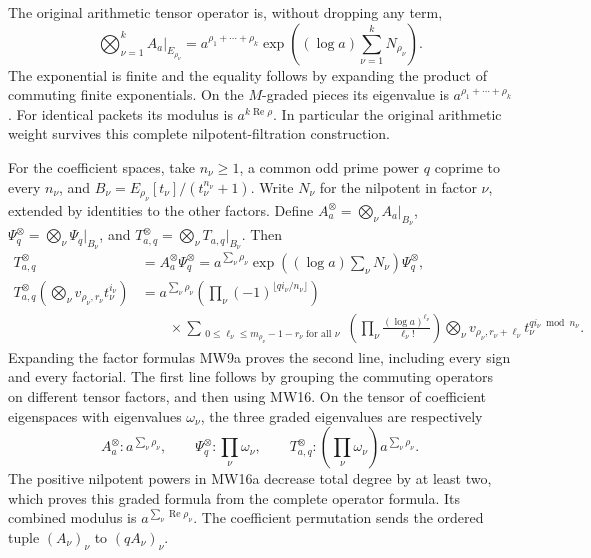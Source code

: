 The original arithmetic tensor operator is, without dropping any term,
\[
 \bigotimes_{\nu=1}^k A_a|_{E_{\rho_\nu}}
  =a^{\rho_1+\cdots+\rho_k}
     \exp\!\left((\log a)\sum_{\nu=1}^k N_{\rho_\nu}\right).
 \tag{MW16}
\]
The exponential is finite and the equality follows by expanding
the product of commuting finite exponentials. On the \(M\)-graded
pieces its eigenvalue is \(a^{\rho_1+\cdots+\rho_k}\).
For identical packets its modulus is \(a^{k\operatorname{Re}\rho}\).
In particular the original arithmetic weight survives this complete
nilpotent-filtration construction.

For the coefficient spaces, take \(n_\nu\geq1\), a common odd prime
power \(q\) coprime to every \(n_\nu\), and
\(B_\nu=E_{\rho_\nu}[t_\nu]/(t_\nu^{n_\nu}+1)\).
Write \(N_\nu\) for the nilpotent in factor \(\nu\), extended by
identities to the other factors. Define
\(A_a^{\otimes}=\bigotimes_\nu A_a|_{B_\nu}\),
\(\Psi_q^{\otimes}=\bigotimes_\nu\Psi_q|_{B_\nu}\), and
\(T_{a,q}^{\otimes}=\bigotimes_\nu T_{a,q}|_{B_\nu}\). Then
\[
 \begin{aligned}
 T_{a,q}^{\otimes}
 &=A_a^{\otimes}\Psi_q^{\otimes}
  =a^{\sum_\nu\rho_\nu}
       \exp\!\left((\log a)\sum_\nu N_\nu\right)
          \Psi_q^{\otimes},\\
 T_{a,q}^{\otimes}\left(\bigotimes_\nu
                         v_{\rho_\nu,r_\nu}t_\nu^{i_\nu}\right)
 &=a^{\sum_\nu\rho_\nu}
   \left(\prod_\nu(-1)^{\lfloor qi_\nu/n_\nu\rfloor}\right)\\
 &\qquad{}\times
   \sum_{\substack{0\leq\ell_\nu\leq
                         m_{\rho_\nu}-1-r_\nu\;\text{for all }\nu}}
   \left(\prod_\nu\frac{(\log a)^{\ell_\nu}}{\ell_\nu!}\right)
   \bigotimes_\nu
    v_{\rho_\nu,r_\nu+\ell_\nu}
                      t_\nu^{qi_\nu\bmod n_\nu}.
 \end{aligned}
 \tag{MW16a}
\]
Expanding the factor formulas MW9a proves the second line, including
every sign and every factorial. The first line follows by grouping
the commuting operators on different tensor factors, and then using
MW16. On the tensor of coefficient eigenspaces with eigenvalues
\(\omega_\nu\), the three graded eigenvalues are respectively
\[
 A_a^{\otimes}:a^{\sum_\nu\rho_\nu},\qquad
 \Psi_q^{\otimes}:\prod_\nu\omega_\nu,\qquad
 T_{a,q}^{\otimes}:\left(\prod_\nu\omega_\nu\right)
                                      a^{\sum_\nu\rho_\nu}.
 \tag{MW16b}
\]
The positive nilpotent powers in MW16a decrease total degree by at
least two, which proves this graded formula from the complete
operator formula. Its combined modulus is
\(a^{\sum_\nu\operatorname{Re}\rho_\nu}\). The coefficient permutation
sends the ordered tuple \((A_\nu)_\nu\) to \((qA_\nu)_\nu\).

